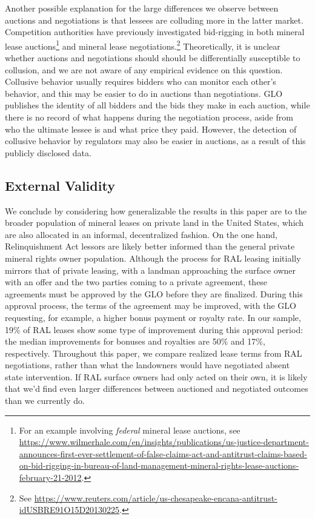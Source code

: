 Another possible explanation for the large differences we observe between auctions and negotiations is that lessees are colluding more in the latter market. Competition authorities have previously investigated bid-rigging in both mineral lease auctions\footnote{For an example involving \textit{federal} mineral lease auctions, see \url{https://www.wilmerhale.com/en/insights/publications/us-justice-department-announces-first-ever-settlement-of-false-claims-act-and-antitrust-claims-based-on-bid-rigging-in-bureau-of-land-management-mineral-rights-lease-auctions-february-21-2012}.} and mineral lease negotiations.\footnote{See \url{https://www.reuters.com/article/us-chesapeake-encana-antitrust-idUSBRE91O15D20130225}.} Theoretically, it is unclear whether auctions and negotiations should should be differentially susceptible to collusion, and we are not aware of any empirical evidence on this question. Collusive behavior usually requires bidders who can monitor each other's behavior, and this may be easier to do in auctions than negotiations.  GLO publishes the identity of all bidders and the bids they make in each auction, while there is no record of what happens during the negotiation process, aside from who the ultimate lessee is and what price they paid. However, the detection of collusive behavior by regulators may also be easier in auctions, as a result of this publicly disclosed data. 

\subsection{External Validity}
We conclude by considering how generalizable the results in this paper are to the broader population of mineral leases on private land in the United States, which are also allocated in an informal, decentralized fashion. On the one hand, Relinquishment Act lessors are likely better informed than the general private mineral rights owner population. Although the process for RAL leasing initially mirrors that of private leasing, with a landman approaching the surface owner with an offer and the two parties coming to a private agreement, these agreements must be approved by the GLO before they are finalized. During this approval process, the terms of the agreement may be improved, with the GLO requesting, for example, a higher bonus payment or royalty rate. In our sample, 19\% of RAL leases show some type of improvement during this approval period: the median improvements for bonuses and royalties are 50\% and 17\%, respectively. Throughout this paper, we compare realized lease terms from RAL negotiations, rather than what the landowners would have negotiated absent state intervention.  If RAL surface owners had only acted on their own, it is likely that we'd find even larger differences between auctioned and negotiated outcomes than we currently do. 

